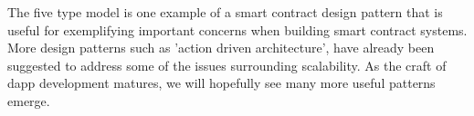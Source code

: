 The five type model is one example of a smart contract design pattern that is useful for exemplifying important concerns when building smart contract systems. More design patterns such as 'action driven architecture'\cite{ActionDriven}, have already been suggested to address some of the issues surrounding scalability. As the craft of dapp development matures, we will hopefully see many more useful patterns emerge. 



